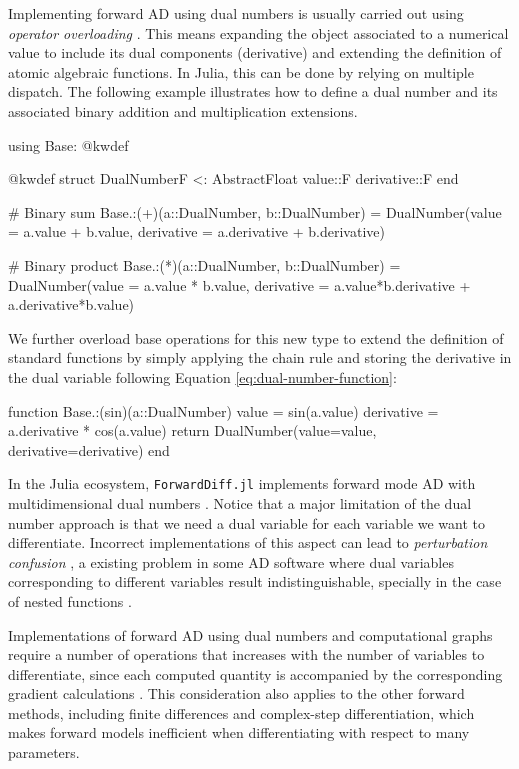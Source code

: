Implementing forward AD using dual numbers is usually carried out using \textit{operator overloading} \cite{Neuenhofen_2018}. 
This means expanding the object associated to a numerical value to include its dual components (derivative) and extending the definition of atomic algebraic functions. 
In Julia, this can be done by relying on multiple dispatch. 
The following example illustrates how to define a dual number and its associated binary addition and multiplication extensions. 
\begin{jllisting}
using Base: @kwdef

@kwdef struct DualNumber{F <: AbstractFloat}
    value::F
    derivative::F
end

# Binary sum
Base.:(+)(a::DualNumber, b::DualNumber) = DualNumber(value = a.value + b.value, derivative = a.derivative + b.derivative)

# Binary product 
Base.:(*)(a::DualNumber, b::DualNumber) = DualNumber(value = a.value * b.value, derivative = a.value*b.derivative + a.derivative*b.value)
\end{jllisting}
We further overload base operations for this new type to extend the definition of standard functions by simply applying the chain rule and storing the derivative in the dual variable following Equation \eqref{eq:dual-number-function}:
\begin{jllisting}
function Base.:(sin)(a::DualNumber)
    value = sin(a.value)
    derivative = a.derivative * cos(a.value)
    return DualNumber(value=value, derivative=derivative)
end
\end{jllisting}
In the Julia ecosystem, \texttt{ForwardDiff.jl} implements forward mode AD with multidimensional dual numbers \cite{RevelsLubinPapamarkou2016}. 
Notice that a major limitation of the dual number approach is that we need a dual variable for each variable we want to differentiate. 
Incorrect implementations of this aspect can lead to \textit{perturbation confusion} \cite{siskind2005perturbation, manzyuk2019perturbation}, a existing problem in some AD software where dual variables corresponding to different variables result indistinguishable, specially in the case of nested functions \cite{manzyuk2019perturbation}.   

Implementations of forward AD using dual numbers and computational graphs require a number of operations that increases with the number of variables to differentiate, since each computed quantity is accompanied by the corresponding gradient calculations \cite{Griewack-on-AD}. 
This consideration also applies to the other forward methods, including finite differences and complex-step differentiation, which makes forward models inefficient when differentiating with respect to many parameters. 

